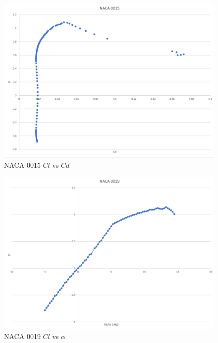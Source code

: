 \documentclass{article}
\begin{document}
\begin{figure}
\begin{center}
	\includegraphics[scale=0.4]{NACA0015clvscd.png}
	\caption{NACA 0015 $Cl$ vs $Cd$}
	\label{Figure 2:}
\end{center}
\end{figure}

\begin{figure}
\begin{center}
	\includegraphics[scale=0.4]{NACA0019clvsalpha.png}
	\caption{NACA 0019 $Cl$ vs $\alpha$}
	\label{Figure 3:}

\end{center}
\end{figure}
\end{document}
